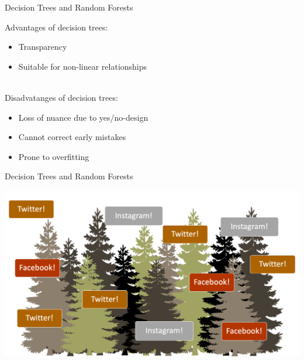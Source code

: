 \documentclass[handout]{beamer}
\begin{document}
\begin{frame}{Decision Trees and Random Forests} 
	
	Advantages of decision trees:
	\begin{itemize}
		\item Transparency
		\item Suitable for non-linear relationships \\\
	\end{itemize}
	
	Disadvatanges of decision trees:
	\begin{itemize}
		\item Loss of nuance due to yes/no-design
		\item Cannot correct early mistakes
		\item Prone to overfitting
	\end{itemize}


\end{frame}


\begin{frame}{Decision Trees and Random Forests}
	
	\begin{center}
		\includegraphics[width=\linewidth,height=\textheight,keepaspectratio]{../pictures/randomforest.png} \\\
	\end{center}
	


	
	
\end{frame}
\end{document}
